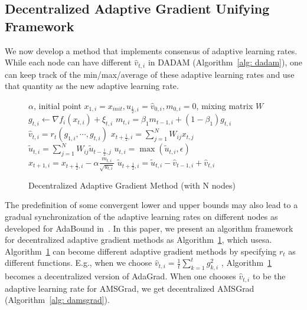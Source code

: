 \documentclass{article} %
\begin{document}
\vspace{-0.1in}

\subsection{Decentralized Adaptive Gradient Unifying Framework}

We now develop a method that implements consensus of adaptive learning rates.
While each node can have different $\hat v_{t,i}$ in DADAM (Algorithm~\ref{alg: dadam}), one can keep track of the min/max/average of these adaptive learning rates and use that quantity as the new adaptive learning rate. 

\begin{figure}
\vspace{-0.15in}
\begin{minipage}{\linewidth}
\begin{algorithm}[H]
	\caption{Decentralized Adaptive Gradient Method (with N nodes)}
	\label{alg: dadaptive}
	\begin{algorithmic}[1]
		  $\alpha$, initial point $x_{1,i} = x_{init}, u_{\frac{1}{2},i} = \hat v_{0,i}, m_{0,i}=0$, mixing matrix $W$
		\STATE  $g_{t,i}  \leftarrow \nabla f_i(x_{t,i}) + \xi_{t,i}$
		\STATE $m_{t,i} = \beta_1 m_{t-1,i} + (1-\beta_1) g_{t,i}$ 
		\STATE $\hat v_{t,i} = r_t(g_{1,i},\cdots,g_{t,i})$
		\STATE $x_{t+\frac{1}{2},i} = \sum_{j=1}^N W_{ij}x_{t,j}$
	    \STATE $\tilde u_{t,i} = \sum_{j=1}^N W_{ij} \tilde u_{t-\frac{1}{2},j}$
	    \STATE $u_{t,i} = \max(\tilde u_{t,i}, \epsilon)$
		\STATE $x_{t+1,i} = x_{t+\frac{1}{2},i} - \alpha \frac{m_{t,i}}{\sqrt{u_{t,i}}}$
		\STATE $\tilde u_{t+\frac{1}{2},i} = \tilde u_{t,i} - \hat v_{t-1,i} + \hat v_{t,i}$
		\ENDFAP
		\ENDFOR
	\end{algorithmic}
\end{algorithm}
\end{minipage}
\end{figure}
The predefinition of some convergent lower and upper bounds may also lead to a gradual synchronization of the adaptive learning rates on different nodes as developed for AdaBound in~\citet{luo2019adaptive}.
In this paper, we present an algorithm framework for decentralized adaptive gradient methods as Algorithm~\ref{alg: dadaptive}, which usesa.  
Algorithm~\ref{alg: dadaptive} can become different adaptive gradient methods by specifying $r_t$ as different functions. E.g., when we choose $\hat v_{t,i} = {\frac{1}{t}\sum_{k=1}^t g_{k,i}^2}$ , Algorithm~\ref{alg: dadaptive} becomes a decentralized version of AdaGrad. When one chooses $\hat v_{t,i}$ to be the adaptive learning rate for AMSGrad, we get decentralized AMSGrad (Algorithm~\ref{alg: damsgrad}).
\end{document}
